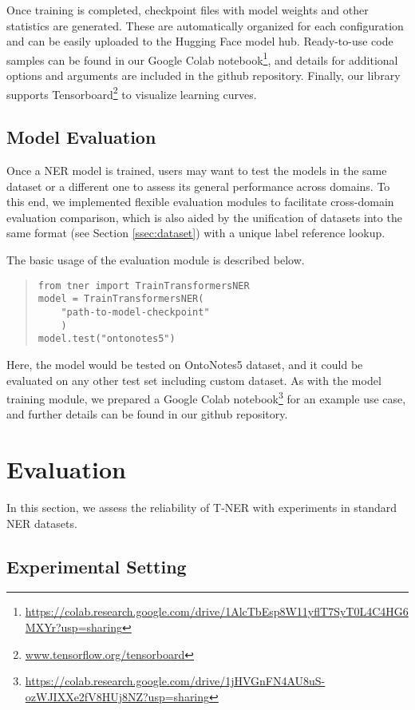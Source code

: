 \documentclass[11pt,a4paper]{article}
\begin{document}
Once training is completed, checkpoint files with model weights and other statistics are generated. These are automatically organized for each configuration
and can be easily uploaded to the Hugging Face model hub. 
Ready-to-use code samples can be found in our Google Colab notebook\footnote{\url{https://colab.research.google.com/drive/1AlcTbEsp8W11yflT7SyT0L4C4HG6MXYr?usp=sharing}}, and
details for additional options and arguments are included in the github repository.
Finally, our library supports Tensorboard\footnote{\url{www.tensorflow.org/tensorboard}} to visualize learning curves.

\subsection{Model Evaluation}
Once a NER model is trained, users may want to test the models in the same dataset or a different one to assess its general performance across domains. To this end, we implemented flexible evaluation modules to facilitate cross-domain evaluation comparison, which is also aided by the unification of datasets into the same format (see Section \ref{ssec:dataset}) with a unique label reference lookup. 

The basic usage of the evaluation module is described below.

\begin{quote}
\small
\begin{verbatim}
from tner import TrainTransformersNER
model = TrainTransformersNER(
    "path-to-model-checkpoint"
    )
model.test("ontonotes5")
\end{verbatim}
\end{quote}

Here, the model would be tested on OntoNotes5 dataset, and it could be evaluated on any other test set including custom dataset. As with the model training module, we prepared a Google Colab notebook\footnote{\url{https://colab.research.google.com/drive/1jHVGnFN4AU8uS-ozWJIXXe2fV8HUj8NZ?usp=sharing}} for an example use case, and further details can be found in our github repository.

\section{Evaluation}
\label{sec:experiments}

In this section, we assess the reliability of T-NER with experiments in standard NER datasets.

\subsection{Experimental Setting}
\end{document}

